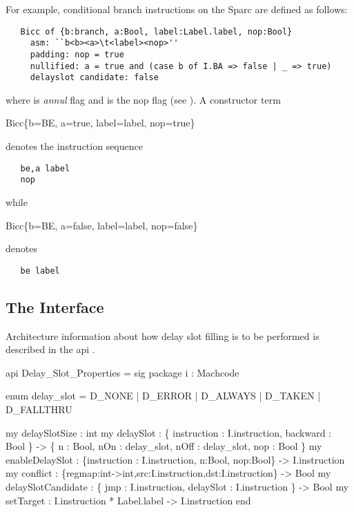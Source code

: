 For example, conditional branch instructions on the Sparc are defined 
as follows:
\begin{verbatim}
   Bicc of {b:branch, a:Bool, label:Label.label, nop:Bool}
     asm: ``b<b><a>\t<label><nop>''
     padding: nop = true
     nullified: a = true and (case b of I.BA => false | _ => true)
     delayslot candidate: false
\end{verbatim}
\noindent where  is \emph{annul} flag and  is the nop 
flag (see ).
A constructor term
\begin{SML}
   Bicc\{b=BE, a=true, label=label, nop=true\}
\end{SML}
denotes the instruction sequence
\begin{verbatim}
   be,a label
   nop
\end{verbatim}
while
\begin{SML}
   Bicc\{b=BE, a=false, label=label, nop=false\}
\end{SML}
denotes 
\begin{verbatim}
   be label
\end{verbatim}


\subsection{The Interface}

Architecture information about how delay slot filling is to be performed
is described in the api
.
\begin{SML}
api Delay_Slot_Properties =
sig
   package i : Machcode

   enum delay_slot = 
     D_NONE   | D_ERROR   | D_ALWAYS  
   | D_TAKEN  | D_FALLTHRU 

   my delaySlotSize : int 
   my delaySlot : \{ instruction : I.instruction, backward : Bool \} -> 
		   \{ n    : Bool,      
		     nOn  : delay_slot,
		     nOff : delay_slot,
		     nop  : Bool      
		   \} 
   my enableDelaySlot : 
	 \{instruction : I.instruction, n:Bool, nop:Bool\} -> I.instruction
   my conflict : 
         \{regmap:int->int,src:I.instruction,dst:I.instruction\} -> Bool
   my delaySlotCandidate : 
         \{ jmp : I.instruction, delaySlot : I.instruction \} -> Bool
   my setTarget : I.instruction * Label.label -> I.instruction
end
\end{SML}


